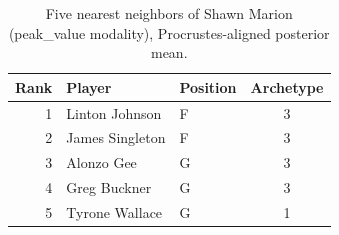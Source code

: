 \begin{table}[htbp]
  \centering\small
  \begin{tabular}{rllc}
    \toprule
    Rank & Player & Position & Archetype \\
    \midrule
    1 & Linton Johnson & F & 3 \\
    2 & James Singleton & F & 3 \\
    3 & Alonzo Gee & G & 3 \\
    4 & Greg Buckner & G & 3 \\
    5 & Tyrone Wallace & G & 1 \\
    \bottomrule
  \end{tabular}
  \caption{Five nearest neighbors of Shawn Marion (peak_value modality), Procrustes-aligned posterior mean.}
  \label{tab:Shawn_Marion_neighbors_peak_value}
\end{table}

